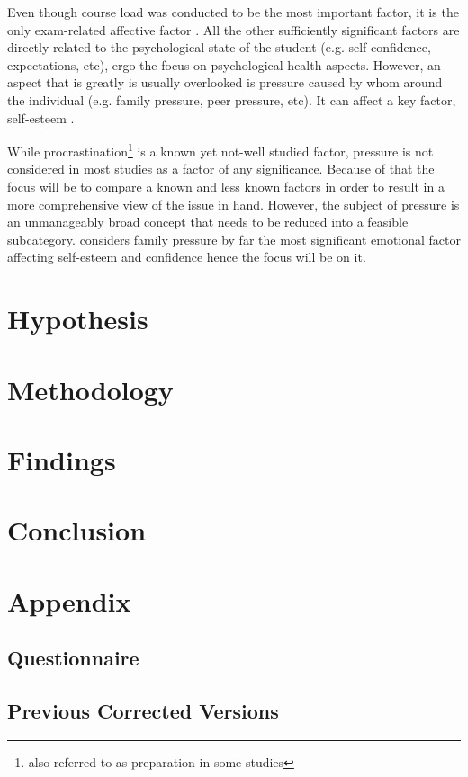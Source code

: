 \documentclass[12pt]{report}
\begin{document}
Even though course load was conducted to be the most important factor, it is the
only exam-related affective factor \parencite{hashmat2008factors}. All the other
sufficiently significant factors are directly related to the psychological state
of the student (e.g. self-confidence, expectations, etc), ergo the focus on
psychological health aspects. However, an aspect that is greatly is usually
overlooked is pressure caused by whom around the individual (e.g. family
pressure, peer pressure, etc). It can affect a key factor, self-esteem
\parencite{whitbeck1991family}.

While procrastination\footnote{also referred to as preparation in some studies}
is a known yet not-well studied factor, pressure is not considered in most
studies as a factor of any significance. Because of that the focus will be to
compare a known and less known factors in order to result in a more
comprehensive view of the issue in hand. However, the subject of pressure is an
unmanageably broad concept that needs to be reduced into a feasible subcategory.
\cite{whitbeck1991family} considers family pressure by far the most significant
emotional factor affecting self-esteem and confidence hence the focus will be on
it.

\chapter{Hypothesis}

\lipsum

\chapter{Methodology}

\lipsum

\chapter{Findings}

\lipsum

\chapter{Conclusion}

\lipsum

\printbibliography[heading=bibnumbered]

\chapter{Appendix}

\section{Questionnaire}
\lipsum
\section{Previous Corrected Versions}
\lipsum
\end{document}

